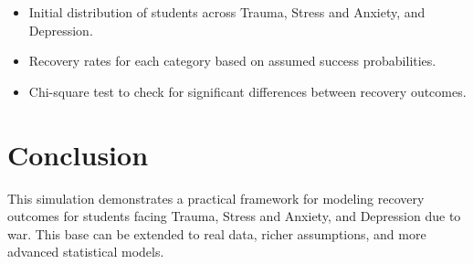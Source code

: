 \documentclass[12pt]{article}
\begin{document}
\begin{itemize}
  \item Initial distribution of students across Trauma, Stress and Anxiety, and Depression.
  \item Recovery rates for each category based on assumed success probabilities.
  \item Chi-square test to check for significant differences between recovery outcomes.
\end{itemize}

\section*{Conclusion}

This simulation demonstrates a practical framework for modeling recovery outcomes for students facing Trauma, Stress and Anxiety, and Depression due to war. This base can be extended to real data, richer assumptions, and more advanced statistical models.
\end{document}
